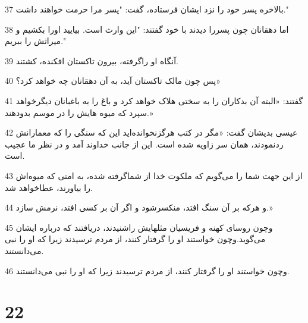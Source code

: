 \par 37 بالاخره پسر خود را نزد ایشان فرستاده، گفت: "پسر مرا حرمت خواهند داشت."
\par 38 اما دهقانان چون پسررا دیدند با خود گفتند: "این وارث است. بیایید اورا بکشیم و میراثش را ببریم."
\par 39 آنگاه او راگرفته، بیرون تاکستان افکنده، کشتند.
\par 40 پس چون مالک تاکستان آید، به آن دهقانان چه خواهد کرد؟»
\par 41 گفتند: «البته آن بدکاران را به سختی هلاک خواهد کرد و باغ را به باغبانان دیگرخواهد سپرد که میوه هایش را در موسم بدودهند.»
\par 42 عیسی بدیشان گفت: «مگر در کتب هرگزنخوانده‌اید این که سنگی را که معمارانش ردنمودند، همان سر زاویه شده است. این از جانب خداوند آمد و در نظر ما عجیب است.
\par 43 از این جهت شما را می‌گویم که ملکوت خدا از شماگرفته شده، به امتی که میوه‌اش را بیاورند، عطاخواهد شد.
\par 44 و هر‌که بر آن سنگ افتد، منکسرشود و اگر آن بر کسی افتد، نرمش سازد.»
\par 45 وچون روسای کهنه و فریسیان مثلهایش راشنیدند، دریافتند که درباره ایشان می‌گوید.وچون خواستند او را گرفتار کنند، از مردم ترسیدند زیرا که او را نبی می‌دانستند.
\par 46 وچون خواستند او را گرفتار کنند، از مردم ترسیدند زیرا که او را نبی می‌دانستند.

\chapter{22}

